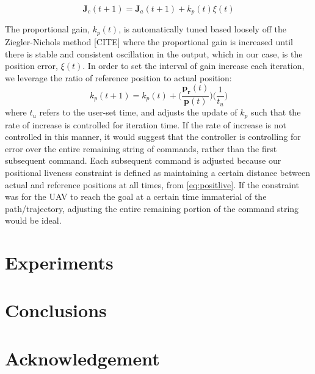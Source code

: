 \documentclass[letterpaper, 10 pt, conference]{ieeeconf}  %
\begin{document}
\begin{equation}
    \mathbf{J}_c(t+1) = \mathbf{J}_a(t+1) + k_p(t)\xi(t)
\end{equation}

The proportional gain, $k_p(t)$, is automatically tuned based loosely off the Ziegler-Nichols method [CITE] where the proportional gain is increased until there is stable and consistent oscillation in the output, which in our case, is the position error, $\xi(t)$. In order to set the interval of gain increase each iteration, we leverage the ratio of reference position to actual position:
\begin{equation}
    k_p(t+1) = k_p(t) + \bigg(\frac{\mathbf{p_r}(t)}{\mathbf{p}(t)}\bigg)\bigg(\frac{1}{t_u}\bigg)
\end{equation}
where $t_u$ refers to the user-set time, and adjusts the update of $k_p$ such that the rate of increase is controlled for iteration time. If the rate of increase is not controlled in this manner, it would suggest that the controller is controlling for error over the entire remaining string of commands, rather than the first subsequent command. Each subsequent command is adjusted because our positional liveness constraint is defined as maintaining a certain distance between actual and reference positions at all times, from \eqref{eq:positlive}. If the constraint was for the UAV to reach the goal at a certain time immaterial of the path/trajectory, adjusting the entire remaining portion of the command string would be ideal.


\section{Experiments}




\section{Conclusions}

\section{Acknowledgement}


\addtolength{\textheight}{-12cm}   %
\end{document}
